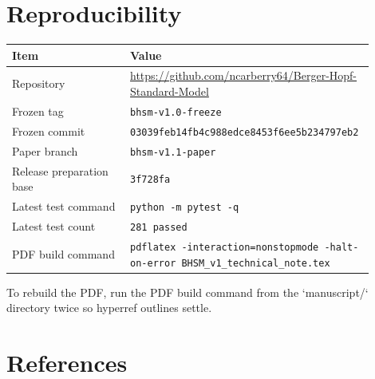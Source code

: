 \documentclass[11pt]{article}
\newcommand{\CommitHash}{\texttt{03039feb14fb4c988edce}\allowbreak\texttt{8453f6ee5b234797eb2}}
\newcommand{\RepoURL}{\url{https://github.com/ncarberry64/Berger-Hopf-Standard-Model}}
\begin{document}
\section{Reproducibility}

\begin{longtable}{@{}L{0.32\linewidth}L{0.58\linewidth}@{}}
\toprule
Item & Value \\
\midrule
Repository & \RepoURL{} \\
Frozen tag & \texttt{bhsm-v1.0-freeze} \\
Frozen commit & \CommitHash{} \\
Paper branch & \texttt{bhsm-v1.1-paper} \\
Release preparation base & \texttt{3f728fa} \\
Latest test command & \texttt{python -m pytest -q} \\
Latest test count & \texttt{281 passed} \\
PDF build command & \texttt{pdflatex -interaction=nonstopmode -halt-on-error BHSM\_v1\_technical\_note.tex} \\
\bottomrule
\end{longtable}

To rebuild the PDF, run the PDF build command from the `manuscript/` directory
twice so hyperref outlines settle.

\section{References}
\end{document}
